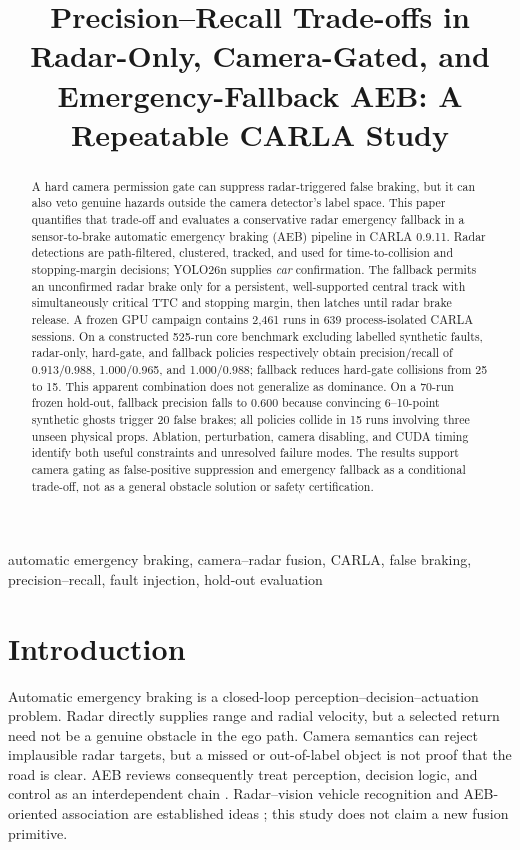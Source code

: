 \documentclass[conference]{IEEEtran}
\title{Precision--Recall Trade-offs in Radar-Only, Camera-Gated, and Emergency-Fallback AEB: A Repeatable CARLA Study}
\author{
\IEEEauthorblockN{Mai Viet Hoang and Duc An Pham}
\IEEEauthorblockA{\textit{Hanoi University of Science and Technology}\\
Hanoi, Vietnam\\hoangmai04222@gmail.com}
}
\begin{document}
\maketitle

\begin{abstract}
A hard camera permission gate can suppress radar-triggered false braking, but it
can also veto genuine hazards outside the camera detector's label space. This
paper quantifies that trade-off and evaluates a conservative radar emergency
fallback in a sensor-to-brake automatic emergency braking (AEB) pipeline in
CARLA 0.9.11. Radar detections are path-filtered, clustered, tracked, and used
for time-to-collision and stopping-margin decisions; YOLO26n supplies \emph{car}
confirmation. The fallback permits an unconfirmed radar brake only for a
persistent, well-supported central track with simultaneously critical TTC and
stopping margin, then latches until radar brake release. A frozen GPU campaign
contains 2,461 runs in 639 process-isolated CARLA sessions. On a constructed
525-run core benchmark excluding labelled synthetic faults, radar-only,
hard-gate, and fallback policies respectively obtain precision/recall of
0.913/0.988, 1.000/0.965, and 1.000/0.988; fallback reduces hard-gate collisions
from 25 to 15. This apparent combination does not generalize as dominance. On a
70-run frozen hold-out, fallback precision falls to 0.600 because convincing
6--10-point synthetic ghosts trigger 20 false brakes; all policies collide in
15 runs involving three unseen physical props. Ablation, perturbation, camera
disabling, and CUDA timing identify both useful constraints and unresolved
failure modes. The results support camera gating as false-positive suppression
and emergency fallback as a conditional trade-off, not as a general obstacle
solution or safety certification.
\end{abstract}

\begin{IEEEkeywords}
automatic emergency braking, camera--radar fusion, CARLA, false braking,
precision--recall, fault injection, hold-out evaluation
\end{IEEEkeywords}

\section{Introduction}
Automatic emergency braking is a closed-loop perception--decision--actuation
problem. Radar directly supplies range and radial velocity, but a selected
return need not be a genuine obstacle in the ego path. Camera semantics can
reject implausible radar targets, but a missed or out-of-label object is not
proof that the road is clear. AEB reviews consequently treat perception,
decision logic, and control as an interdependent chain \cite{yang2022aebreview}.
Radar--vision vehicle recognition and AEB-oriented association are established
ideas \cite{kim2013vehicle,hsu2015noise}; this study does not claim a new fusion
primitive.
\end{document}
